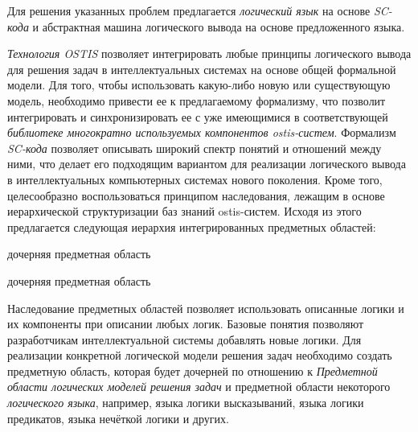 Для решения указанных проблем предлагается \textit{логический язык} на основе \textit{SC-кода} и абстрактная машина логического вывода на основе предложенного языка. 

\textit{Технология OSTIS} позволяет интегрировать любые принципы логического вывода для решения задач в интеллектуальных системах на основе общей формальной модели. Для того, чтобы использовать какую-либо новую или существующую модель, необходимо привести ее к предлагаемому формализму, что позволит интегрировать и синхронизировать ее с уже имеющимися в соответствующей \textit{библиотеке многократно используемых компонентов ostis-систем}. Формализм \textit{SC-кода} позволяет описывать широкий спектр понятий и отношений между ними, что делает его подходящим вариантом для реализации логического вывода в интеллектуальных компьютерных системах нового поколения. Кроме того, целесообразно воспользоваться принципом наследования, лежащим в основе иерархической структуризации баз знаний ostis-систем. Исходя из этого предлагается следующая иерархия интегрированных предметных областей:

\begin{SCn}
	\begin{scnrelfromlist}{дочерняя предметная область}
	\end{scnrelfromlist}
	
	\begin{scnindent}
	\end{scnindent}
	
	\begin{scnreltolist}{дочерняя предметная область}
	\end{scnreltolist}
\end{SCn}

Наследование предметных областей позволяет использовать описанные логики и их компоненты при описании любых логик. Базовые понятия позволяют разработчикам интеллектуальной системы добавлять новые логики. Для реализации конкретной логической модели решения задач необходимо создать предметную область, которая будет дочерней по отношению к \textit{Предметной области логических моделей решения задач} и предметной области некоторого \textit{логического языка}, например, языка логики высказываний, языка логики предикатов, языка нечёткой логики и других.

